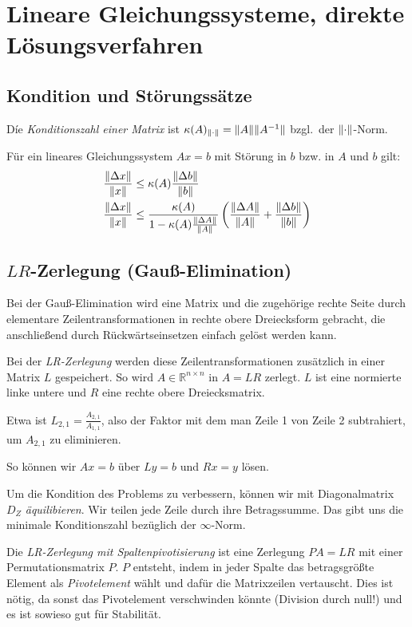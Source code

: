 \documentclass[a4paper,parskip=half*,DIV=15,fontsize=11pt]{scrartcl}
\DeclarePairedDelimiter\norm{\lVert}{\rVert}
\begin{document}
\section{Lineare Gleichungssysteme, direkte Lösungsverfahren}

\subsection{Kondition und Störungssätze}

Díe \emph{Konditionszahl einer Matrix} ist $\kappa(A)_{\norm{\cdot}} = \norm{A} \norm{A^{-1}}$ bzgl.\ der $\norm{\cdot}$-Norm.

Für ein lineares Gleichungssystem $Ax = b$ mit Störung in $b$ bzw. in $A$ und $b$ gilt:
\begin{align*}
	\frac{\norm{\Delta x}}{\norm{x}} &\leq \kappa(A) \frac{\norm{\Delta b}}{\norm{b}}	\\
    \frac{\norm{\Delta x}}{\norm{x}} &\leq \frac{\kappa(A)}{1-\kappa(A)\frac{\norm{\Delta A}}{\norm{A}}}\left(\frac{\norm{\Delta A}}{\norm{A}}+\frac{\norm{\Delta b}}{\norm{b}}\right)
\end{align*}

\subsection[LR-Zerlegung]{$LR$-Zerlegung (Gauß-Elimination)}

Bei der Gauß-Elimination wird eine Matrix und die zugehörige rechte Seite durch elementare Zeilentransformationen in rechte obere Dreiecksform gebracht, die anschließend durch Rückwärtseinsetzen einfach gelöst werden kann.

Bei der \emph{LR-Zerlegung} werden diese Zeilentransformationen zusätzlich in einer Matrix $L$ gespeichert. So wird $A \in \mathbb{R}^{n \times n}$ in $A = LR$ zerlegt.
$L$ ist eine normierte linke untere und $R$ eine rechte obere Dreiecksmatrix.

Etwa ist $L_{2,1} = \frac{A_{2,1}}{A_{1,1}}$, also der Faktor mit dem man Zeile 1 von Zeile 2 subtrahiert, um $A_{2,1}$ zu eliminieren.

So können wir $Ax = b$ über $L y = b$ und $Rx = y$ lösen.

Um die Kondition des Problems zu verbessern, können wir mit Diagonalmatrix $D_Z$ \emph{äquilibieren}. Wir teilen jede Zeile durch ihre Betragssumme. Das gibt uns die minimale Konditionszahl bezüglich der $\infty$-Norm.

Die \emph{LR-Zerlegung mit Spaltenpivotisierung} ist eine Zerlegung $PA = LR$ mit einer Permutationsmatrix $P$. $P$ entsteht, indem in jeder Spalte das betragsgrößte Element als \emph{Pivotelement} wählt und dafür die Matrixzeilen vertauscht. Dies ist nötig, da sonst das Pivotelement verschwinden könnte (Division durch null!) und es ist sowieso gut für Stabilität.
\end{document}
